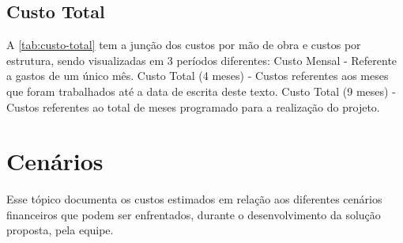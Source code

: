 \documentclass[
	12pt,				%
	openany,			%
	oneside,			%
	a4paper,			%
	english,			%
	french,				%
	spanish,			%
	brazil				%
	]{abntex2}
\begin{document}
\subsection{Custo Total}

A \autoref{tab:custo-total} tem a junção dos custos por mão de obra e custos por estrutura, sendo visualizadas em 3 períodos diferentes:
Custo Mensal - Referente a gastos de um único mês.
Custo Total (4 meses) - Custos referentes aos meses que foram trabalhados até a data de escrita deste texto.
Custo Total (9 meses) - Custos referentes ao total de meses programado para a realização do projeto.

\begin{table}[h!]
	\centering
	\caption{Custo Total por Categoria}
	\label{tab:custo-total}
\end{table}

\section{Cenários}
Esse tópico documenta os custos estimados em relação aos diferentes cenários financeiros que podem ser enfrentados, durante o desenvolvimento da solução proposta, pela equipe.
\end{document}

